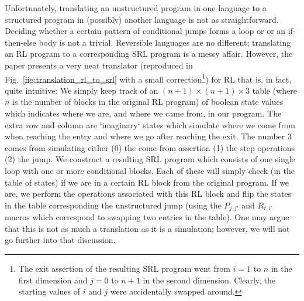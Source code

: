 Unfortunately, translating an unstructured program in one language to a structured program in (possibly) another language is not as straightforward. Deciding whether a certain pattern of conditional jumps forms a loop or or an if-then-else body is not a trivial. Reversible languages are no different; translating an RL program to a corresponding SRL program is a messy affair. However, the paper \cite[Fig.~22]{REV} presents a very neat translator (reproduced in Fig.~\ref{fig:translation_rl_to_srl} with a small correction\footnote{The exit assertion of the resulting SRL program went from $i=1$ to $n$ in the first dimension and $j=0$ to $n+1$ in the second dimension. Clearly, the starting values of $i$ and $j$ were accidentally swapped around.}) for RL that is, in fact, quite intuitive: We simply keep track of an $(n+1) \times (n+1) \times 3$ table (where $n$ is the number of blocks in the original RL program) of boolean state values which indicates where we are, and where we came from, in our program. The extra row and column are `imaginary` states which simulate where we come from when reaching the entry and where we go after reaching the exit. The number $3$ comes from simulating either (0) the come-from assertion (1) the step operations (2) the jump. We construct a resulting SRL program which consists of one single loop with one or more conditional blocks. Each of these will simply check (in the table of states) if we are in a certain RL block from the original program. If we are, we perform the operations associated with this RL block and flip the states in the table corresponding the unstructured jump (using the $P_{j,j'}$ and $R_{i,i'}$ macros which correspond to swapping two entries in the table). One may argue that this is not as much a translation as it is a simulation; however, we will not go further into that discussion.

